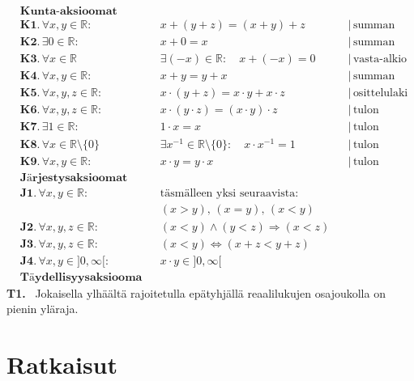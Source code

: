 \begin{align*}
&\textbf{Kunta-aksioomat} \\
&\textbf{K1.} \, \forall x, y \in \mathbb{R}: & &x+(y+z) = (x+y)+z & &| \, \text{summan liitäntälaki} \\
&\textbf{K2.} \, \exists 0 \in \mathbb{R}: & &x+0 = x & &| \, \text{summan neutraalialkio} \\
&\textbf{K3.} \, \forall x \in \mathbb{R} & &\exists (-x) \in \mathbb{R}: \quad x+(-x)=0 & &| \, \text{vasta-alkio} \\
&\textbf{K4.} \, \forall x, y \in \mathbb{R}: & &x+y = y+x & &| \, \text{summan vaihdantalaki} \\
&\textbf{K5.} \, \forall x, y, z \in \mathbb{R}: & &x \cdot (y+z) = x \cdot y + x \cdot z & &| \, \text{osittelulaki} \\
&\textbf{K6.} \, \forall x, y, z \in \mathbb{R}: & &x \cdot (y \cdot z) = (x \cdot y) \cdot z & &| \, \text{tulon liitäntälaki} \\
&\textbf{K7.} \, \exists 1 \in \mathbb{R}: & &1 \cdot x = x & &| \, \text{tulon neutraalialkio} \\
&\textbf{K8.} \, \forall x \in \mathbb{R} \setminus \{0\} & &\exists x^{-1} \in \mathbb{R} \setminus \{0\}: \quad x \cdot x^{-1}=1 & &| \, \text{tulon käänteisalkio} \\
&\textbf{K9.} \, \forall x, y \in \mathbb{R}: & &x \cdot y = y \cdot x & &| \, \text{tulon vaihdantalaki} \\
&\textbf{Järjestysaksioomat} \\
&\textbf{J1.} \, \forall x, y \in \mathbb{R}: & &\text{täsmälleen yksi seuraavista:} & \\
& & &(x > y), \, (x = y), \, (x < y) & \\
&\textbf{J2.} \, \forall x, y, z \in \mathbb{R}: & &(x < y) \land (y < z) \Rightarrow (x < z) & \\
&\textbf{J3.} \, \forall x, y, z \in \mathbb{R}: & &(x < y) \Leftrightarrow (x + z < y + z) & \\
&\textbf{J4.} \, \forall x, y \in ]0,\infty[: & &x \cdot y \in ]0,\infty[ & \\
&\textbf{Täydellisyysaksiooma}
\end{align*}
\textbf{T1.} \, Jokaisella ylhäältä rajoitetulla epätyhjällä reaalilukujen osajoukolla on pienin yläraja.

\chapter{Ratkaisut}


